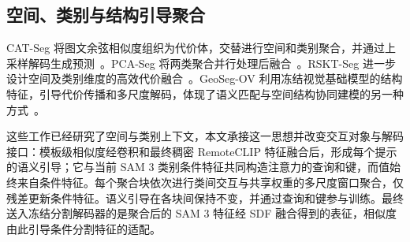\subsection{空间、类别与结构引导聚合}
CAT-Seg 将图文余弦相似度组织为代价体，交替进行空间和类别聚合，并通过上采样解码生成预测~\cite{choCATSegCostAggregation2024}。PCA-Seg 将两类聚合并行处理后融合~\cite{yinPCASegRevisitingCost2026}。RSKT-Seg 进一步设计空间及类别维度的高效代价融合~\cite{liExploringEfficientOpenVocabulary2026}。GeoSeg-OV 利用冻结视觉基础模型的结构特征，引导代价传播和多尺度解码，体现了语义匹配与空间结构协同建模的另一种方式~\cite{liuGeoSegOV2026}。

这些工作已经研究了空间与类别上下文，本文承接这一思想并改变交互对象与解码接口：模板级相似度经卷积和最终稠密 RemoteCLIP 特征融合后，形成每个提示的语义引导；它与当前 SAM 3 类别条件特征共同构造注意力的查询和键，而值始终来自条件特征。每个聚合块依次进行类间交互与共享权重的多尺度窗口聚合，仅残差更新条件特征。语义引导在各块间保持不变，并通过查询和键参与训练。最终送入冻结分割解码器的是聚合后的 SAM 3 特征经 SDF 融合得到的表征，相似度由此引导条件分割特征的适配。
